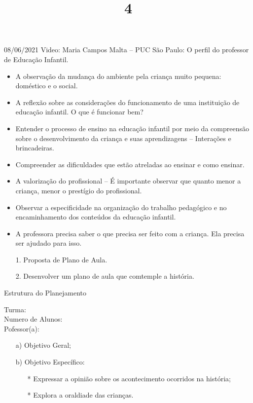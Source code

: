 \documentclass{SchoolBook}
\begin{document}
    \begin{day}{08/06/2021}
        Video: Maria Campos Malta -- PUC São Paulo: O perfil do professor de Educação Infantil.
        
        \begin{itemize}[nosep]
            \item A observação da mudança do ambiente pela criança muito pequena: doméstico e o social.
            \item A reflexão sobre as considerações do funcionamento de uma instituição de educação infantil. O que é funcionar bem?
            \item Entender o processo de ensino na educação infantil por meio da compreensão sobre o desenvolvimento da criança e suas aprendizagens -- Interações e brincadeiras.
            \item Compreender as dificuldades que estão atreladas ao ensinar e como ensinar.
            \item A valorização do profissional -- É importante observar que quanto menor a criança, menor o prestígio do profissional.
            \item Observar a especificidade na organização do trabalho pedagógico e no encaminhamento dos conteúdos da educação infantil.
            \item A professora precisa saber o que precisa ser feito com a criança. Ela precisa ser ajudado para isso.
        \end{itemize}
        
        \begin{enumerate}[nosep]
            \item[1.] Proposta de Plano de Aula.
            \item[2.] Desenvolver um plano de aula que comtemple a história.
        \end{enumerate}
        
        \title{4}{Estrutura do Planejamento}
        
        \noindent Turma: \\
        Numero de Alunos: \\
        Pofessor(a):
        
        \begin{enumerate}
            \item[a)] Objetivo Geral;
            \item[b)] Objetivo Específico:
            \begin{itemize}[nosep]
                \item[*] Expressar a opinião sobre os acontecimento ocorridos na história;
                \item[*] Explora a oraldiade das crianças.
            \end{itemize}
            

\end{enumerate}
\end{day}
\end{document}

